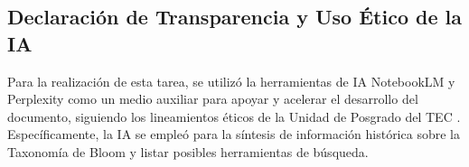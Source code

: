 \subsection{Declaración de Transparencia y Uso Ético de la IA}
Para la realización de esta tarea, se utilizó la herramientas de IA NotebookLM y Perplexity como un medio auxiliar para apoyar y acelerar el desarrollo del documento, siguiendo los lineamientos éticos de la Unidad de Posgrado del TEC
\cite{tec2025politicasIA}. Específicamente, la IA se empleó para la síntesis de información histórica sobre la Taxonomía de Bloom y listar posibles herramientas de búsqueda.